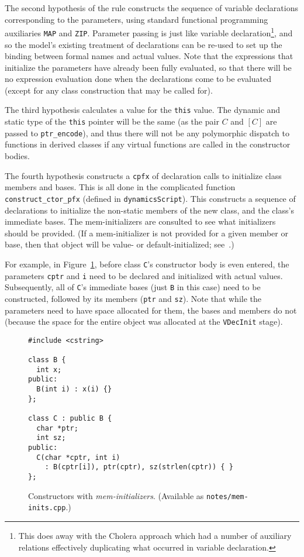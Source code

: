 \documentclass[11pt]{article}
\begin{document}
The second hypothesis of the rule constructs the sequence of variable
declarations corresponding to the parameters, using standard
functional programming auxiliaries \texttt{MAP} and \texttt{ZIP}.
Parameter passing is just like variable declaration\footnote{This does
  away with the \textsf{Cholera} approach which had a number of
  auxiliary relations effectively duplicating what occurred in
  variable declaration.}, and so the model's existing treatment of
declarations can be re-used to set up the binding between formal names
and actual values.  Note that the expressions that initialize the
parameters have already been fully evaluated, so that there will be no
expression evaluation done when the declarations come to be evaluated
(except for any class construction that may be called for).

The third hypothesis calculates a value for the \texttt{this} value.
The dynamic and static type of the \texttt{this} pointer will be the
same (as the pair $C$ and $[C]$ are passed to \texttt{ptr_encode}),
and thus there will not be any polymorphic dispatch to functions in
derived classes if any virtual functions are called in the constructor
bodies.

The fourth hypothesis constructs a \texttt{cpfx} of declaration calls
to initialize class members and bases.  This is all done in the
complicated function \texttt{construct_ctor_pfx} (defined in
\texttt{dynamicsScript}).  This constructs a sequence of declarations
to initialize the non-static members of the new class, and the class's
immediate bases.  The mem-initializers are consulted to see what
initializers should be provided.  (If a mem-initializer is not
provided for a given member or base, then that object will be value-
or default-initialized; see~\cite[\S12.6.2, paragraphs
3--4]{cpp-standard-iso14882}.)

For example, in Figure~\ref{fig:mem-inits}, before class \texttt{C}'s
constructor body is even entered, the parameters \texttt{cptr} and
\texttt{i} need to be declared and initialized with actual values.
Subsequently, all of \texttt{C}'s immediate bases (just \texttt{B} in
this case) need to be constructed, followed by its members
(\texttt{ptr} and \texttt{sz}).  Note that while the parameters need
to have space allocated for them, the bases and members do not
(because the space for the entire object was allocated at the
\texttt{VDecInit} stage).

\begin{figure}[htbp]
\begin{verbatim}
#include <cstring>

class B {
  int x;
public:
  B(int i) : x(i) {}
};

class C : public B {
  char *ptr;
  int sz;
public:
  C(char *cptr, int i)
    : B(cptr[i]), ptr(cptr), sz(strlen(cptr)) { }
};
\end{verbatim}
  \caption[\cpp{} Constructors with \emph{mem-initializers}]{\cpp{}
    Constructors with \emph{mem-initializers}.  (Available as
    \texttt{notes/mem-inits.cpp}.)}
\label{fig:mem-inits}
\end{figure}
\end{document}
